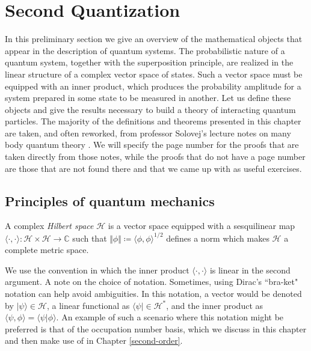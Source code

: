 \chapter{Second Quantization}
\label{second-quantization}

In this preliminary section we give an overview of the mathematical objects that appear in the
description of quantum systems. The probabilistic nature of a quantum system, together with
the superposition principle, are realized in the linear structure of a complex vector space of
states. Such a vector space must be equipped with an inner product, which produces
the probability amplitude for a system prepared in some state to be measured in another. Let
us define these objects and give the results necessary to build a theory of interacting quantum
particles. The majority of the definitions and theorems presented in this chapter are taken,
and often reworked, from professor Solovej's lecture notes on many body quantum theory
\cite{SolNotes}. We will specify the page number for the proofs that are taken directly from
those notes, while the proofs that do not have a page number are those that are not found
there and that we came up with as useful exercises.

\section{Principles of quantum mechanics}

\begin{definition}
	A complex \textit{Hilbert space} $\mathcal{H}$ is a vector space equipped with a
	sesquilinear map $\langle\cdot,\cdot\rangle:\mathcal{H}\times\mathcal{H}\to\mathbb{C}$
	such that $\Vert\phi\Vert\coloneq\langle\phi,\phi\rangle^{1/2}$ defines a norm which makes
	$\mathcal{H}$ a complete metric space.
\end{definition}

We use the convention in which the inner product $\langle\cdot,\cdot\rangle$ is linear in the
second argument.
A note on the choice of notation. Sometimes, using Dirac's ``bra-ket" notation can help avoid
ambiguities. In this notation, a vector would be denoted by $|\psi\rangle\in\mathcal{H}$, a
linear functional as $\langle\psi|\in\mathcal{H}^*$, and the inner product as $\langle\psi,
\phi\rangle=\langle\psi|\phi\rangle$. An example of such a scenario where this notation
might be preferred is that of the occupation number basis, which we discuss in this chapter
and then make use of in Chapter \ref{second-order}.

